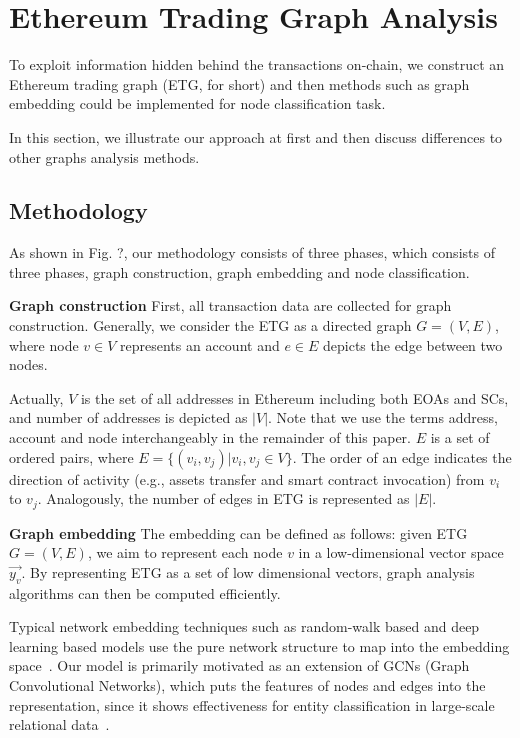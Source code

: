 
\section{Ethereum Trading Graph Analysis}
To exploit information hidden behind the transactions on-chain, we construct an Ethereum trading graph (ETG, for short) and then  methods such as graph embedding could be implemented for node classification task.

In this section, we illustrate our approach at first and then discuss differences to other graphs analysis methods.

\subsection{Methodology}
As shown in Fig. ?, our methodology consists of three phases, which consists of three phases, graph construction, graph embedding and node classification. 

\textbf{Graph construction}
First, all transaction data are collected for graph construction. Generally, we consider the ETG as a directed graph $G=(V,E)$, where node $v \in V$ represents an account and $e \in E$ depicts the edge between two nodes. 

Actually, $V$ is the set of all addresses in Ethereum including both EOAs and SCs, and number of addresses is depicted as $|V|$. Note that we use the terms address, account and node interchangeably in the remainder of this paper. $E$ is a set of ordered pairs, where $E=\{(v_i,v_j)|v_i,v_j \in V\}$. The order of an edge indicates the direction of activity (e.g., assets transfer and smart contract invocation) from $v_i$ to $v_j$. Analogously, the number of edges in ETG is represented as $|E|$.



\textbf{Graph embedding}
The embedding can be defined as follows: given ETG $G=(V,E)$, we aim to represent each node $v$ in a low-dimensional vector space $\vec{y_v}$. By representing ETG as a set of low dimensional vectors, graph analysis algorithms can then be computed efficiently. 

Typical network embedding techniques such as random-walk based and deep learning based models use the pure network structure to map into the embedding space~\cite{goyal2018capturing}. Our model is primarily motivated as an extension of GCNs (Graph Convolutional Networks), which puts the features of nodes and edges into the representation, since it shows effectiveness for entity classification in large-scale relational data~\cite{kipf2016semi}.

